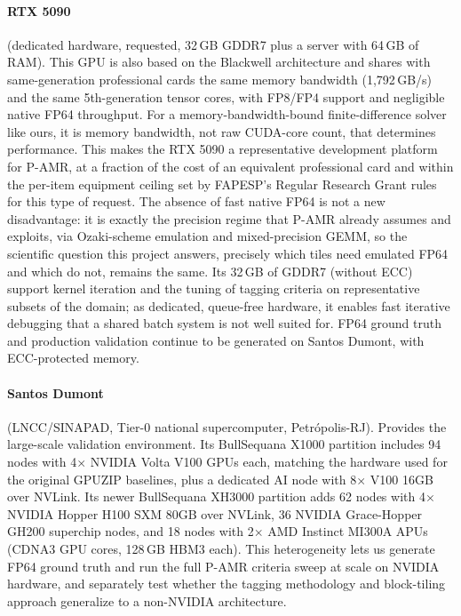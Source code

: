 \documentclass[12pt,a4paper]{article}
\newcommand{\pamr}{P\nobreakdash-AMR}
\begin{document}
\paragraph{RTX 5090} (dedicated hardware, requested, 32\,GB GDDR7 plus a
server with 64\,GB of RAM). This GPU is also based on the Blackwell
architecture and shares with same-generation professional cards the same
memory bandwidth (1,792\,GB/s) and the same 5th-generation tensor cores,
with FP8/FP4 support and negligible native FP64 throughput. For a
memory-bandwidth-bound finite-difference solver like ours, it is memory
bandwidth, not raw CUDA-core count, that determines performance. This
makes the RTX 5090 a representative development platform for \pamr{}, at
a fraction of the cost of an equivalent professional card and within the
per-item equipment ceiling set by FAPESP's Regular Research Grant rules
for this type of request. The absence of fast native FP64 is not a new
disadvantage: it is exactly the precision regime that \pamr{} already
assumes and exploits, via Ozaki-scheme emulation and mixed-precision
GEMM, so the scientific question this project answers, precisely which
tiles need emulated FP64 and which do not, remains the same. Its 32\,GB
of GDDR7 (without ECC) support kernel iteration and the tuning of tagging
criteria on representative subsets of the domain; as dedicated,
queue-free hardware, it enables fast iterative debugging that a shared
batch system is not well suited for. FP64 ground truth and production
validation continue to be generated on Santos Dumont, with ECC-protected
memory.

\paragraph{Santos Dumont} (LNCC/SINAPAD, Tier-0 national supercomputer,
Petr\'opolis-RJ). Provides the large-scale validation environment. Its
BullSequana X1000 partition includes 94 nodes with 4$\times$ NVIDIA Volta
V100 GPUs each, matching the hardware used for the original GPUZIP
baselines, plus a dedicated AI node with 8$\times$ V100 16GB over NVLink.
Its newer BullSequana XH3000 partition adds 62 nodes with 4$\times$ NVIDIA
Hopper H100 SXM 80GB over NVLink, 36 NVIDIA Grace-Hopper GH200 superchip
nodes, and 18 nodes with 2$\times$ AMD Instinct MI300A APUs (CDNA3 GPU
cores, 128\,GB HBM3 each). This heterogeneity lets us generate FP64 ground
truth and run the full \pamr{} criteria sweep at scale on NVIDIA hardware,
and separately test whether the tagging methodology and block-tiling
approach generalize to a non-NVIDIA architecture.
\end{document}
